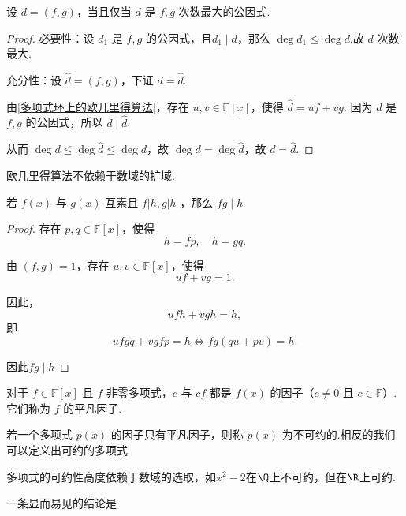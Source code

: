 \begin{corollary}
	设 \( d = (f, g) \)，当且仅当 \( d \) 是 \( f, g \) 次数最大的公因式.
\end{corollary}
\begin{proof}
	必要性：设 \( d_1 \) 是 \( f, g \) 的公因式，且\( d_1 \mid d \)，那么 \( \deg d_1 \leqslant \deg d \).故 \( d \) 次数最大.
	
	充分性：设 \( \hat{d} = (f, g) \)，下证 \( d = \hat{d} \).
	
	由\ref{多项式环上的欧几里得算法}，存在 \( u, v \in \mathbb{F}[x] \)，使得 \( \hat{d} = uf + vg \).
	因为 \( d \) 是 \( f, g \) 的公因式，所以 \( d \mid \hat{d} \).
	
	从而 \( \deg d \leqslant \deg \hat{d} \leqslant \deg d \)，故 \( \deg d = \deg \hat{d} \)，故 \( d = \hat{d} \).
	
\end{proof}

欧几里得算法不依赖于数域的扩域.
\begin{corollary}
若 $f(x)$ 与 $g(x)$ 互素且 $f|h, g| h$ ，那么 $f g \mid h$
\end{corollary}
\begin{proof}

存在 \( p, q \in \mathbb{F}[x] \)，使得
\[ h = fp, \quad h = gq. \]

由 \( (f, g) = 1 \)，存在 \( u, v \in \mathbb{F}[x] \)，使得
\[ uf + vg = 1. \]

因此，
\[ ufh + vgh = h, \]
即
\[ ufgq + vgfp = h \Leftrightarrow fg(qu + pv) = h. \]

因此$f g \mid h$

\end{proof}

\begin{definition}\label{p1:concept:c1-l789}
	对于 \( f \in \mathbb{F}[x] \) 且 \( f \) 非零多项式，\( c \) 与 \( cf \) 都是 \( f(x) \) 的因子（\( c \neq 0 \) 且 \( c \in \mathbb{F} \)）.它们称为 \( f \) 的平凡因子.
	
	若一个多项式 \( p(x) \) 的因子只有平凡因子，则称 \( p(x) \) 为不可约的.相反的我们可以定义出可约的多项式
\end{definition}
多项式的可约性高度依赖于数域的选取，如$x^2-2$在$\Q$上不可约，但在$\R$上可约.

一条显而易见的结论是

